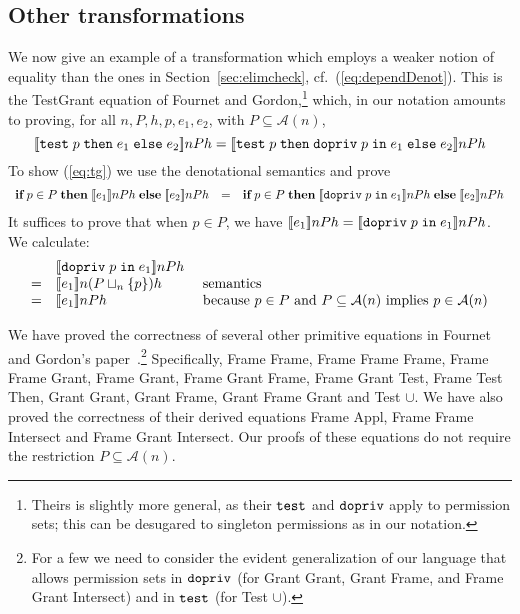 \documentclass[submission,copyright,creativecommons]{eptcs}
\newcommand{\mifthenelse}[3]{\MIF\;#1\;\MTHEN\;#2\;\MELSE\;#3}
\newcommand{\enable}[2]{\ENABLE\;#1\;\IN\;#2}
\newcommand{\test}[3]{\TEST\;#1\;\THEN\;#2\;\ELSE\;#3}
\newcommand{\ELSE}{\mbox{\texttt{else}}}
\newcommand{\IN}{\mbox{\texttt{in}}}
\newcommand{\THEN}{{\texttt{then}}}
\newcommand{\MTHEN}{{\textbf{then}}}
\newcommand{\MELSE}{{\textbf{else}}}
\newcommand{\MIF}{{\textbf{if}}}
\newcommand{\A}{\mathcal{A}}
\newcommand{\ldb}{[\![}
\newcommand{\rdb}{]\!]}
\newcommand{\means}[1]{\ldb {#1}\rdb}
\newcommand{\union}{\cup}
\newcommand{\lub}{\sqcup}
\newcommand{\ENABLE}{\mbox{\texttt{dopriv}}}
\newcommand{\TEST}{\mbox{\texttt{test}}}
\newcommand{\n}{n} \newcommand{\p}{p} \newcommand{\Ps}{\Pi} \newcommand{\h}{h}
\begin{document}
\subsection{Other transformations}
We now give an example of a transformation which employs a weaker notion of
equality than the ones in Section~\ref{sec:elimcheck}, cf.~(\ref{eq:dependDenot}).
This is the \textsf{TestGrant} equation of Fournet and Gordon,\footnote{Theirs is slightly more general, as their $\TEST$ and $\ENABLE$ apply to permission sets; this can be desugared to singleton permissions as in our notation.}
 which, in our notation amounts to proving,
for all $\n, P, h, p, e_1, e_2$, with $P \subseteq \A(\n)$,
\begin{equation}
\label{eq:tg}
\means{\test{p}{e_1}{e_2}}\n P h = \means{\test{p}{\enable{p}{e_1}}{e_2}}\n P h
\end{equation}
To show (\ref{eq:tg}) we use the denotational semantics and prove
\[
\begin{array}{lcl}
\mifthenelse{p\in P}{\means{e_1}\n P h}{\means{e_2}\n P h}
&=&
\mifthenelse{p\in P}{\means{\enable{p}{e_1}}\n P h}{\means{e_2}\n P h}
\end{array}
\]
It suffices to prove that when $p \in P$, we have
$
\means{e_1}\n P h = \means{\enable{p}{e_1}}\n P h
$.
We calculate:
\[
\begin{array}{cll}
& \means{\enable{p}{e_1}}\n P h\\
= & \means{e_1}\n (P \lub_n \{p\}) h & \mbox{ semantics}\\
= & \means{e_1}\n P h & \mbox{ because $p \in P$ and $P \subseteq \A(n)$ implies $p\in \A(n)$}
\end{array}
\]

We have proved the correctness of several other primitive equations
in Fournet and Gordon's paper~\cite[Section 4.1]{FournetG03}.\footnote{For a few we need to consider the evident generalization of our language that allows permission sets in $\ENABLE$ (for \textsf{Grant Grant}, 
\textsf{Grant Frame}, and \textsf{Frame Grant Intersect}) and in $\TEST$ (for \textsf{Test $\union$}).
}
Specifically,
\textsf{Frame Frame, Frame Frame Frame, Frame Frame Grant, 
Frame Grant, 
Frame Grant Frame, 
Frame Grant Test, 
Frame Test Then, 
Grant Grant, Grant Frame, Grant Frame Grant}
 and \textsf{Test $\union$}. We have also proved the correctness of their derived equations 
\textsf{Frame Appl, Frame Frame Intersect} and 
\textsf{Frame Grant Intersect}.  Our proofs of these equations do not require the restriction $P \subseteq \A(n)$.
\end{document}
